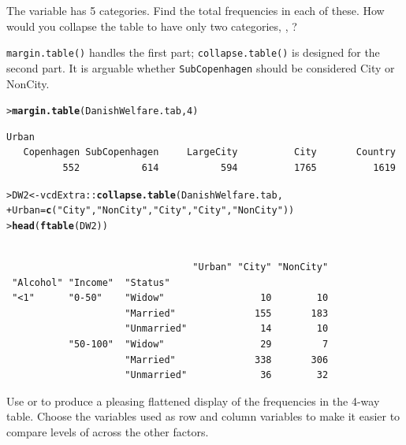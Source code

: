 \documentclass[10pt]{report}\usepackage[]{graphicx}\usepackage[]{color}
\makeatletter
\newcommand{\hlnum}[1]{\textcolor[rgb]{0.686,0.059,0.569}{#1}}%
\newcommand{\hlstr}[1]{\textcolor[rgb]{0.192,0.494,0.8}{#1}}%
\newcommand{\hlopt}[1]{\textcolor[rgb]{0,0,0}{#1}}%
\newcommand{\hlstd}[1]{\textcolor[rgb]{0.345,0.345,0.345}{#1}}%
\newcommand{\hlkwb}[1]{\textcolor[rgb]{0.69,0.353,0.396}{#1}}%
\newcommand{\hlkwc}[1]{\textcolor[rgb]{0.333,0.667,0.333}{#1}}%
\newcommand{\hlkwd}[1]{\textcolor[rgb]{0.737,0.353,0.396}{\textbf{#1}}}%
\newenvironment{kframe}{%
 \def\at@end@of@kframe{}%
 \ifinner\ifhmode%
  \def\at@end@of@kframe{\end{minipage}}%
  \begin{minipage}{\columnwidth}%
 \fi\fi%
 \def\FrameCommand##1{\hskip\@totalleftmargin \hskip-\fboxsep
 \colorbox{shadecolor}{##1}\hskip-\fboxsep
     \hskip-\linewidth \hskip-\@totalleftmargin \hskip\columnwidth}%
 \MakeFramed {\advance\hsize-\width
   \@totalleftmargin\z@ \linewidth\hsize
   \@setminipage}}%
 {\par\unskip\endMakeFramed%
 \at@end@of@kframe}
\newenvironment{knitrout}{}{} %
\renewenvironment{knitrout}{\small\renewcommand{\baselinestretch}{.85}}{} %
\makeatother
\begin{document}
\begin{Exercises}
\begin{enumerate*}
    \item The variable  has 5 categories.  Find the total frequencies
    in each of these.  How would you collapse the table to have only
    two categories, , ?
    \begin{ans}
      \texttt{margin.table()} handles the first part; \texttt{collapse.table()} is designed for the second part. 
      It is arguable whether
      \texttt{SubCopenhagen} should be considered City or NonCity.
\begin{knitrout}\footnotesize
{}\color{fgcolor}\begin{kframe}
\begin{alltt}
\hlstd{> }\hlkwd{margin.table}\hlstd{(DanishWelfare.tab,} \hlnum{4}\hlstd{)}
\end{alltt}
\begin{verbatim}
Urban
   Copenhagen SubCopenhagen     LargeCity          City       Country 
          552           614           594          1765          1619 
\end{verbatim}
\begin{alltt}
\hlstd{> }\hlstd{DW2} \hlkwb{<-} \hlstd{vcdExtra}\hlopt{::}\hlkwd{collapse.table}\hlstd{(DanishWelfare.tab,}
\hlstd{+ }                                \hlkwc{Urban}\hlstd{=}\hlkwd{c}\hlstd{(}\hlstr{"City"}\hlstd{,}\hlstr{"NonCity"}\hlstd{,}\hlstr{"City"}\hlstd{,}\hlstr{"City"}\hlstd{,}\hlstr{"NonCity"}\hlstd{))}
\hlstd{> }\hlkwd{head}\hlstd{(}\hlkwd{ftable}\hlstd{(DW2))}
\end{alltt}
\begin{verbatim}
                                                         
                                 "Urban" "City" "NonCity"
 "Alcohol" "Income"  "Status"                            
 "<1"      "0-50"    "Widow"                 10        10
                     "Married"              155       183
                     "Unmarried"             14        10
           "50-100"  "Widow"                 29         7
                     "Married"              338       306
                     "Unmarried"             36        32
\end{verbatim}
\end{kframe}
\end{knitrout}
    \end{ans}
    
    \item Use  or  to produce a pleasing
    flattened display of the frequencies in the 4-way table.  Choose the
    variables used as row and column variables to make it easier to compare
    levels of  across the other factors.
    \begin{ans}
    \end{ans}
    

\end{enumerate*}
\end{Exercises}
\end{document}
